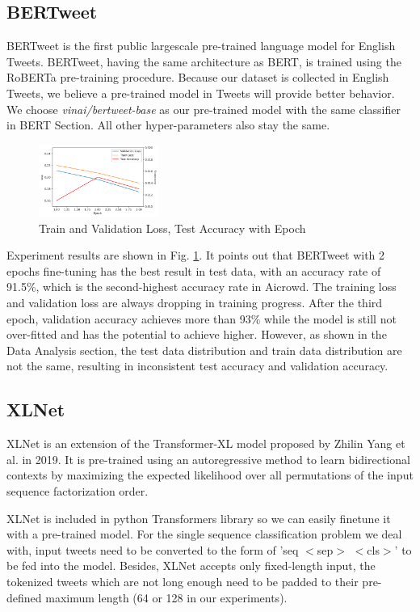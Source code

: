 \documentclass[journal]{IEEEtran}
\begin{document}
\subsection{BERTweet}
BERTweet is the first public largescale pre-trained language model for English Tweets.\cite{bertweet} BERTweet, having the same architecture as BERT, is
trained using the RoBERTa pre-training procedure. Because our dataset is collected in English Tweets, we believe a pre-trained model in Tweets will provide better behavior. We choose \textit{vinai/bertweet-base} as our pre-trained model with the same classifier in BERT Section. All other hyper-parameters also stay the same.
\begin{figure}[H]
\centering
\includegraphics[width=0.35\textwidth]{bertweet.png}
\caption{Train and Validation Loss, Test Accuracy with Epoch}
\label{bertweet}
\end{figure}
Experiment results are shown in Fig. \ref{bertweet}. It points out that BERTweet with 2 epochs fine-tuning has the best result in test data, with an accuracy rate of 91.5\%, which is the second-highest accuracy rate in Aicrowd.
The training loss and validation loss are always dropping in training progress. After the third epoch, validation accuracy achieves more than 93\% while the model is still not over-fitted and has the potential to achieve higher. However, as shown in the Data Analysis section, the test data distribution and train data distribution are not the same, resulting in inconsistent test accuracy and validation accuracy.

\subsection{XLNet}
XLNet\cite{xlnet} is an extension of the Transformer-XL model proposed by Zhilin Yang et al. in 2019. It is pre-trained using an autoregressive method to learn bidirectional contexts by maximizing the expected likelihood over all permutations of the input sequence factorization order.

XLNet is included in python Transformers library so we can easily finetune it with a pre-trained model. For the single sequence classification problem we deal with, input tweets need to be converted to the form of 'seq $<$sep$>$ $<$cls$>$' to be fed into the model. Besides, XLNet accepts only fixed-length input, the tokenized tweets which are not long enough need to be padded to their pre-defined maximum length (64 or 128 in our experiments).
\end{document}
